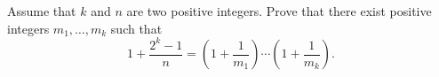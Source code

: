Assume that $k$ and $n$ are two positive integers. Prove that there exist positive integers $m_1 , \dots , m_k$ such that \[1+\frac{2^k-1}{n}=\left(1+\frac1{m_1}\right)\cdots \left(1+\frac1{m_k}\right).\]